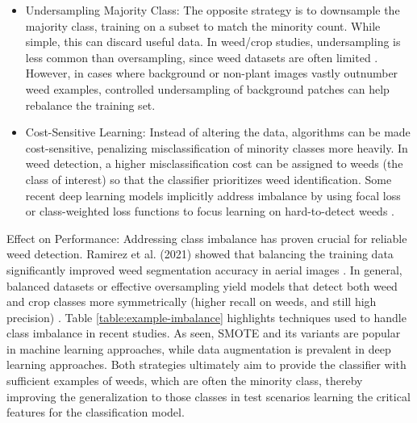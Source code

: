 \documentclass[letterpaper]{report}
\begin{document}
\begin{itemize}
	\item{Undersampling Majority Class: The opposite strategy is to downsample the majority class, training on a subset to match the minority count. While simple, this can discard useful data. In weed/crop studies, undersampling is less common than oversampling, since weed datasets are often limited \parencite{Mahmudul-Hasan2022-cj}. However, in cases where background or non-plant images vastly outnumber weed examples, controlled undersampling of background patches can help rebalance the training set.}  

	\item{Cost-Sensitive Learning: Instead of altering the data, algorithms can be made cost-sensitive, penalizing misclassification of minority classes more heavily. In weed detection, a higher misclassification cost can be assigned to weeds (the class of interest) so that the classifier prioritizes weed identification. Some recent deep learning models implicitly address imbalance by using focal loss or class-weighted loss functions to focus learning on hard-to-detect weeds \parencite{Wu2021-gt}. } 
\end{itemize}

Effect on Performance: Addressing class imbalance has proven crucial for reliable weed detection. Ramirez et al. (2021) showed that balancing the training data significantly improved weed segmentation accuracy in aerial images \parencite{Wu2021-gt}. In general, balanced datasets or effective oversampling yield models that detect both weed and crop classes more symmetrically (higher recall on weeds, and still high precision) \parencite{Bazrafkan2024-bl}. Table \ref{table:example-imbalance} highlights techniques used to handle class imbalance in recent studies. As seen, SMOTE and its variants are popular in machine learning approaches, while data augmentation is prevalent in deep learning approaches. Both strategies ultimately aim to provide the classifier with sufficient examples of weeds, which are often the minority class, thereby improving the generalization to those classes in test scenarios learning the critical features for the classification model.  
\end{document}
